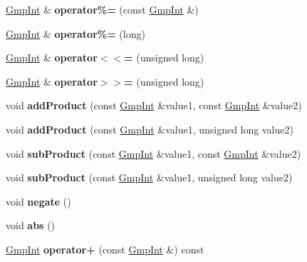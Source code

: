 \begin{DoxyCompactItemize}
\hyperlink{class_gmp_int}{Gmp\+Int} \& {\bfseries operator\%=} (const \hyperlink{class_gmp_int}{Gmp\+Int} \&)
\item 
\mbox{\label{class_gmp_int_a471eb9ea0688a40f13f0616f2d7cb3ca}} 
\hyperlink{class_gmp_int}{Gmp\+Int} \& {\bfseries operator\%=} (long)
\item 
\mbox{\label{class_gmp_int_a843bdf4262c4a51a69f6a2b657c1f358}} 
\hyperlink{class_gmp_int}{Gmp\+Int} \& {\bfseries operator$<$$<$=} (unsigned long)
\item 
\mbox{\label{class_gmp_int_af675d23e4631edb9f6bb69840b017af8}} 
\hyperlink{class_gmp_int}{Gmp\+Int} \& {\bfseries operator$>$$>$=} (unsigned long)
\item 
\mbox{\label{class_gmp_int_a6108a1ed85c367f5ab1307be5c02ca75}} 
void {\bfseries add\+Product} (const \hyperlink{class_gmp_int}{Gmp\+Int} \&value1, const \hyperlink{class_gmp_int}{Gmp\+Int} \&value2)
\item 
\mbox{\label{class_gmp_int_a23d67865bf1d149f868ebf946153dac9}} 
void {\bfseries add\+Product} (const \hyperlink{class_gmp_int}{Gmp\+Int} \&value1, unsigned long value2)
\item 
\mbox{\label{class_gmp_int_af56e440b21bd5c6bb2980ddda47ba96d}} 
void {\bfseries sub\+Product} (const \hyperlink{class_gmp_int}{Gmp\+Int} \&value1, const \hyperlink{class_gmp_int}{Gmp\+Int} \&value2)
\item 
\mbox{\label{class_gmp_int_a9ac672feed3c35e1278a124270a75f3b}} 
void {\bfseries sub\+Product} (const \hyperlink{class_gmp_int}{Gmp\+Int} \&value1, unsigned long value2)
\item 
\mbox{\label{class_gmp_int_a84208f21b851945f4ab715ba90d10a76}} 
void {\bfseries negate} ()
\item 
\mbox{\label{class_gmp_int_a817a35ae687775915c608f246d4c3a0f}} 
void {\bfseries abs} ()
\item 
\mbox{\label{class_gmp_int_ad315055f4f3491a97b1d64dd70329cc6}} 
\hyperlink{class_gmp_int}{Gmp\+Int} {\bfseries operator+} (const \hyperlink{class_gmp_int}{Gmp\+Int} \&) const

\end{DoxyCompactItemize}
